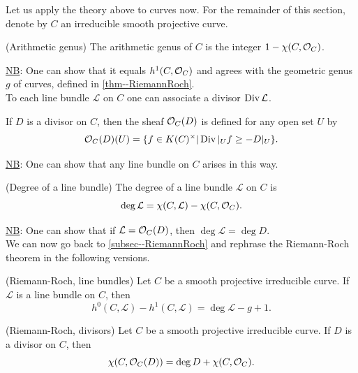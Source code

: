 \documentclass[a4paper,11pt]{article}
\begin{document}
			Let us apply the theory above to curves now. For the remainder of this section, denote by $C$ an irreducible smooth projective curve.
			
			\begin{defi}
				(Arithmetic genus) The arithmetic genus of $C$ is the integer $1-\chi(C,\mathcal{O}_C)$.
			\end{defi}

			\noindent\underline{NB}: One can show that it equals $h^1(C,\mathcal{O}_C)$ and agrees with the geometric genus $g$ of curves, defined in \autoref{thm--RiemannRoch}. 
			\\

			To each line bundle $\mathcal{L}$ on $C$ one can associate a divisor $\operatorname{Div}\mathcal{L}$.

			\begin{defi}
				If $D$ is a divisor on $C$, then the sheaf $\mathcal{O}_C(D)$ is defined for any open set $U$ by 
				\begin{equation*}
					\mathcal{O}_C(D)(U)=\{f\in K(C)^\times|\operatorname{Div}|_Uf\ge-D|_U\}.
				\end{equation*}
			\end{defi}

			\noindent\underline{NB}: One can show that any line bundle on $C$ arises in this way.

			\begin{defi}
				(Degree of a line bundle) The degree of a line bundle $\mathcal{L}$ on $C$ is
				\begin{equation*}
					\deg\mathcal{L}=\chi(C,\mathcal{L})-\chi(C,\mathcal{O}_C).
				\end{equation*}
			\end{defi}

			\noindent\underline{NB}: One can show that if $\mathcal{L}=\mathcal{O}_C(D)$, then $\deg\mathcal{L}=\deg D$.
			\\

			We can now go back to \autoref{subsec--RiemannRoch} and rephrase the Riemann-Roch theorem in the following versions.
			
			\begin{thm}
				(Riemann-Roch, line bundles) Let $C$ be a smooth projective irreducible curve. If $\mathcal{L}$ is a line bundle on $C$, then
				\begin{equation*}
					h^0(C,\mathcal{L})-h^1(C,\mathcal{L})=\deg\mathcal{L}-g+1.
				\end{equation*}
			\end{thm}

			\begin{thm}
				(Riemann-Roch, divisors) Let $C$ be a smooth projective irreducible curve. If $D$ is a divisor on $C$, then 
				\begin{equation*}
					\chi(C,\mathcal{O}_C(D))=\deg D+\chi(C,\mathcal{O}_C).
				\end{equation*}
			\end{thm}
\end{document}
